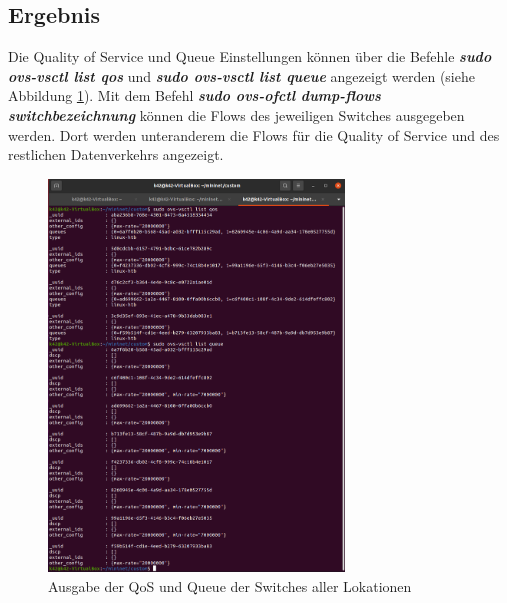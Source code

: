 \documentclass[fontsize=12pt,paper=a4,open=any,parskip=half,
  twoside=false,toc=listof,toc=bibliography,fleqn,leqno,
  captions=nooneline,captions=tableabove,british]{scrbook}
\begin{document}
\subsection{Ergebnis}
Die Quality of Service und Queue Einstellungen können über die Befehle \textit{\textbf{sudo ovs-vsctl list qos}} und \textit{\textbf{sudo ovs-vsctl list queue}} angezeigt werden (siehe Abbildung \ref{queue-qos}). Mit dem Befehl \textit{\textbf{sudo ovs-ofctl dump-flows switchbezeichnung}} können die Flows des jeweiligen Switches ausgegeben werden. Dort werden unteranderem die Flows für die Quality of Service und des restlichen Datenverkehrs angezeigt.

\begin{figure}[H]
 \centering
 \includegraphics[width=0.7\textwidth]{Bilder/queue-qos}
 \captionsetup{justification=centering}
 \caption{Ausgabe der QoS und Queue der Switches aller Lokationen}
 \label{queue-qos}
\end{figure}
\end{document}
